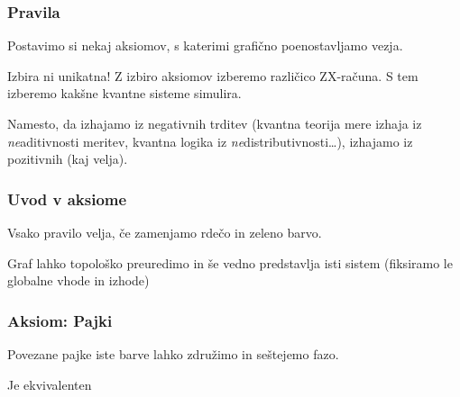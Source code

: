\documentclass[10pt]{beamer}
\begin{document}
\begin{frame}
  \frametitle{Pravila}
  Postavimo si nekaj aksiomov, s katerimi grafično poenostavljamo vezja.

  Izbira ni unikatna! Z izbiro aksiomov izberemo različico ZX-računa. S tem izberemo kakšne kvantne sisteme simulira.

  Namesto, da izhajamo iz negativnih trditev (kvantna teorija mere izhaja iz \emph{ne}aditivnosti meritev, kvantna logika iz \emph{ne}distributivnosti\dots), izhajamo iz pozitivnih (kaj velja).
\end{frame}
\begin{frame}
  \frametitle{Uvod v aksiome}
  Vsako pravilo velja, če zamenjamo rdečo in zeleno barvo.

  Graf lahko topološko preuredimo in še vedno predstavlja isti sistem (fiksiramo le globalne vhode in izhode)
\end{frame}
\begin{frame}
  \frametitle{Aksiom: Pajki}
  Povezane pajke iste barve lahko združimo in seštejemo fazo.\\
  \begin{center}
\end{center}
  Je ekvivalenten
  \begin{center}
\end{center}
\end{frame}
\end{document}
